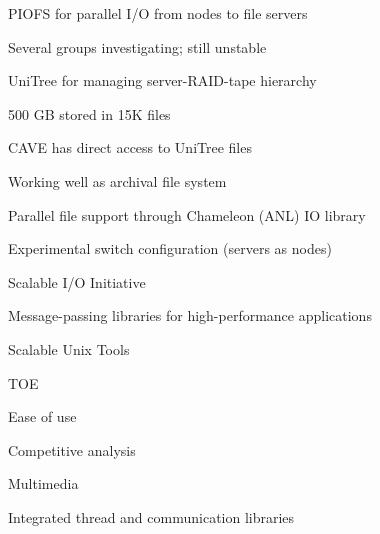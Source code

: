 \begin{small}
\begin{mainpts}
  \item PIOFS for parallel I/O from nodes to file servers

	Several groups investigating; still unstable

  \item UniTree for managing server-RAID-tape hierarchy

	\begin{secpts}
	\item 500 GB stored in 15K files
	
	\item CAVE has direct access to UniTree files

	\item Working well as archival file system

	\item Parallel file support through Chameleon (ANL) IO library 
	\end{secpts}

	
\end{mainpts}
\end{small}
\ve

\begin{small}
\begin{mainpts}
  \item Experimental switch configuration (servers as nodes)
  \item Scalable I/O Initiative
  \item Message-passing libraries for high-performance applications
  \item Scalable Unix Tools
  \item TOE
  \item Ease of use
  \item Competitive analysis
  \item Multimedia
  \item Integrated thread and communication libraries
  \end{mainpts}
\end{small}
\ve

